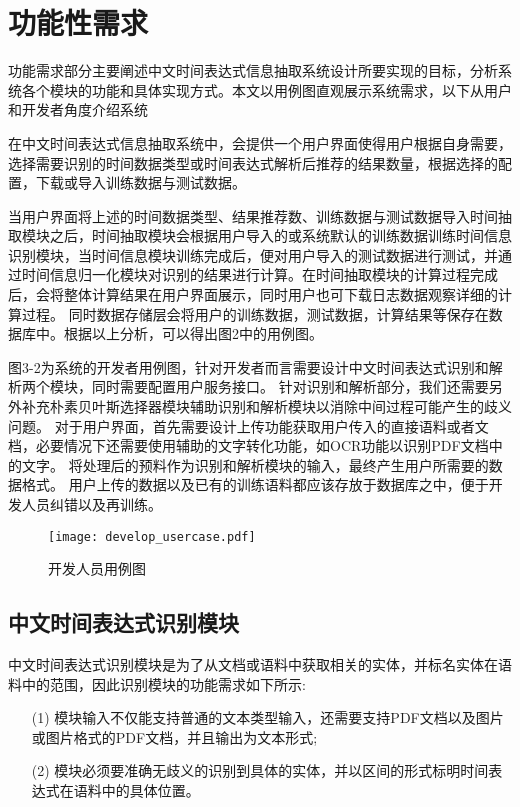 \section{功能性需求}


功能需求部分主要阐述中文时间表达式信息抽取系统设计所要实现的目标，分析系统各个模块的功能和具体实现方式。本文以用例图直观展示系统需求，以下从用户和开发者角度介绍系统

在中文时间表达式信息抽取系统中，会提供一个用户界面使得用户根据自身需要，选择需要识别的时间数据类型或时间表达式解析后推荐的结果数量，根据选择的配置，下载或导入训练数据与测试数据。

当用户界面将上述的时间数据类型、结果推荐数、训练数据与测试数据导入时间抽取模块之后，时间抽取模块会根据用户导入的或系统默认的训练数据训练时间信息识别模块，当时间信息模块训练完成后，便对用户导入的测试数据进行测试，并通过时间信息归一化模块对识别的结果进行计算。在时间抽取模块的计算过程完成后，会将整体计算结果在用户界面展示，同时用户也可下载日志数据观察详细的计算过程。
同时数据存储层会将用户的训练数据，测试数据，计算结果等保存在数据库中。根据以上分析，可以得出图2中的用例图。

图3-2为系统的开发者用例图，针对开发者而言需要设计中文时间表达式识别和解析两个模块，同时需要配置用户服务接口。
针对识别和解析部分，我们还需要另外补充朴素贝叶斯选择器模块辅助识别和解析模块以消除中间过程可能产生的歧义问题。
对于用户界面，首先需要设计上传功能获取用户传入的直接语料或者文档，必要情况下还需要使用辅助的文字转化功能，如OCR功能以识别PDF文档中的文字。
将处理后的预料作为识别和解析模块的输入，最终产生用户所需要的数据格式。
用户上传的数据以及已有的训练语料都应该存放于数据库之中，便于开发人员纠错以及再训练。

\begin{figure}[h]
    \centering
    \texttt{[image: develop\_usercase.pdf]}
    \caption{开发人员用例图}
    \label{fig:develope_usecase}
\end{figure}

\subsection{中文时间表达式识别模块}

中文时间表达式识别模块是为了从文档或语料中获取相关的实体，并标名实体在语料中的范围，因此识别模块的功能需求如下所示:
\begin{enumerate}
    \item[(1)] 模块输入不仅能支持普通的文本类型输入，还需要支持PDF文档以及图片或图片格式的PDF文档，并且输出为文本形式;
    \item[(2)] 模块必须要准确无歧义的识别到具体的实体，并以区间的形式标明时间表达式在语料中的具体位置。
\end{enumerate}

